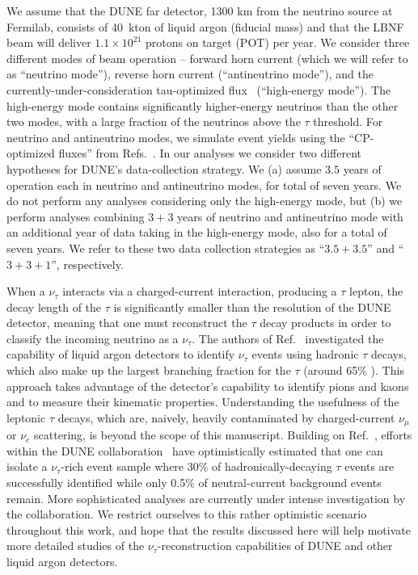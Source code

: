 \documentclass[aps,prd,onecolumn,nofootinbib,superscriptaddress, 11pt]{revtex4}
\begin{document}
We assume that the DUNE far detector, 1300 km from the neutrino source at Fermilab, consists of 40~kton of liquid argon (fiducial mass) and that the LBNF beam will deliver $1.1 \times 10^{21}$ protons on target (POT) per year. We consider three different modes of beam operation -- forward horn current (which we will refer to as ``neutrino mode''), reverse horn current (``antineutrino mode''), and the currently-under-consideration tau-optimized flux~\cite{LauraFlux} (``high-energy mode''). The high-energy mode contains significantly higher-energy neutrinos than the other two modes, with a large fraction of the neutrinos above the $\tau$ threshold. For neutrino and antineutrino modes, we simulate event yields using the ``CP-optimized fluxes'' from Refs.~\cite{LauraFlux,Acciarri:2015uup}. In our analyses we consider two different hypotheses for DUNE's data-collection strategy. We (a) assume $3.5$ years of operation each in neutrino and antineutrino modes, for total of seven years. We do not perform any analyses considering only the high-energy mode, but (b) we perform analyses combining $3 + 3$ years of neutrino and antineutrino mode with an additional year of data taking in the high-energy mode, also for a total of seven years. We refer to these two data collection strategies as ``$3.5+3.5$'' and ``$3+3+1$'', respectively.

When a $\nu_\tau$ interacts via a charged-current interaction, producing a $\tau$ lepton, the decay length of the $\tau$ is significantly smaller than the resolution of the DUNE detector, meaning that one must reconstruct the $\tau$ decay products in order to classify the incoming  neutrino as a $\nu_\tau$. The authors of Ref.~\cite{Conrad:2010mh} investigated the capability of liquid argon detectors to identify $\nu_\tau$ events using hadronic $\tau$ decays, which also make up the largest branching fraction for the $\tau$ (around 65\% \cite{Tanabashi:2018oca}). This approach takes advantage of the detector's capability to identify pions and kaons and to measure their kinematic properties. Understanding the usefulness of the leptonic $\tau$ decays, which are, naively, heavily contaminated by charged-current $\nu_{\mu}$ or $\nu_e$ scattering, is beyond the scope of this manuscript. Building on Ref.~\cite{Conrad:2010mh}, efforts within the DUNE collaboration~\cite{AdamSlides} have optimistically estimated that one can isolate a $\nu_\tau$-rich event sample where 30\% of hadronically-decaying $\tau$ events are successfully identified while only 0.5\% of neutral-current background events remain. More sophisticated analyses are currently under intense investigation by the collaboration. We restrict ourselves to this rather optimistic scenario throughout this work, and hope that the results discussed here will help motivate more detailed studies of the $\nu_{\tau}$-reconstruction capabilities of DUNE and other liquid argon detectors. 
\end{document}
